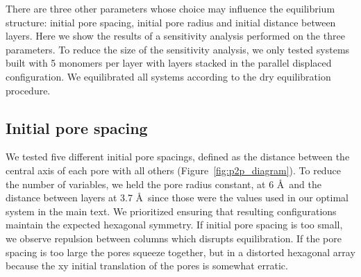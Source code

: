 \documentclass[journal=jpcbfk,manusciprt=article]{achemso}
\begin{document}
  There are three other parameters whose choice may influence the equilibrium
  structure: initial pore spacing, initial pore radius and initial distance
  between layers. Here we show the results of a sensitivity analysis performed
  on the three parameters. To reduce the size of the sensitivity analysis, we
  only tested systems built with 5 monomers per layer with layers stacked in 
  the parallel displaced configuration. We equilibrated all systems according
  to the dry equilibration procedure.


  \subsection{Initial pore spacing}\label{section:initial_pore_spacing}

	  We tested five different initial pore spacings, defined as the
	  distance between the central axis of each pore with all others
	  (Figure~\ref{fig:p2p_diagram}). To reduce the number of variables, we held the
	  pore radius constant, at 6 \AA~and the distance between layers at 3.7 \AA~since
	  those were the values used in our optimal system in the main text. We
	  prioritized ensuring that resulting configurations maintain the expected
	  hexagonal symmetry. If initial pore spacing is too small, we observe repulsion
	  between columns which disrupts equilibration. If the pore spacing is too large
	  the pores squeeze together, but in a distorted hexagonal array because the xy
	  initial translation of the pores is somewhat erratic. 

\end{document}
